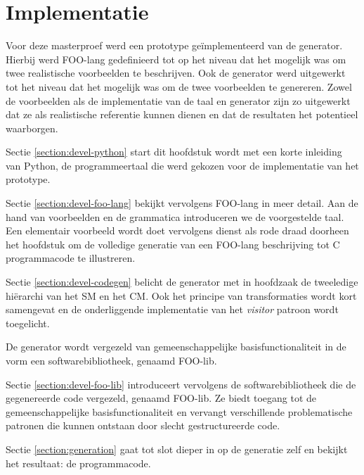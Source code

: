 
\chapter{Implementatie}
\label{chapter:implementatie}

Voor deze masterproef werd een prototype ge\"implementeerd van de generator. Hierbij
werd FOO-lang gedefinieerd tot op het niveau dat het mogelijk was om twee
realistische voorbeelden te beschrijven. Ook de generator werd uitgewerkt tot
het niveau dat het mogelijk was om de twee voorbeelden te genereren. Zowel de
voorbeelden als de implementatie van de taal en generator zijn zo uitgewerkt
dat ze als realistische referentie kunnen dienen en dat de resultaten het
potentieel waarborgen.

Sectie \ref{section:devel-python} start dit hoofdstuk wordt met een korte
inleiding van Python, de programmeertaal die werd gekozen voor de implementatie
van het prototype.

Sectie \ref{section:devel-foo-lang} bekijkt vervolgens FOO-lang in meer detail.
Aan de hand van voorbeelden en de grammatica introduceren we de voorgestelde
taal. Een elementair voorbeeld wordt doet vervolgens dienst als rode draad
doorheen het hoofdstuk om de volledige generatie van een FOO-lang beschrijving
tot C programmacode te illustreren.

Sectie \ref{section:devel-codegen} belicht de generator met in hoofdzaak de
tweeledige hi\"erarchi van het SM en het CM. Ook het principe van
transformaties wordt kort samengevat en de onderliggende implementatie van het
\emph{visitor} patroon \citep{gamma1994design} wordt toegelicht.

De generator wordt vergezeld van gemeenschappelijke basisfunctionaliteit in de
vorm een softwarebibliotheek, genaamd FOO-lib.

Sectie \ref{section:devel-foo-lib} introduceert vervolgens de
softwarebibliotheek die de gegenereerde code vergezeld, genaamd FOO-lib. Ze
biedt toegang tot de gemeenschappelijke basisfunctionaliteit en vervangt
verschillende problematische patronen die kunnen ontstaan door slecht
gestructureerde code.

Sectie \ref{section:generation} gaat tot slot dieper in op de generatie zelf en
bekijkt het resultaat: de programmacode. 






